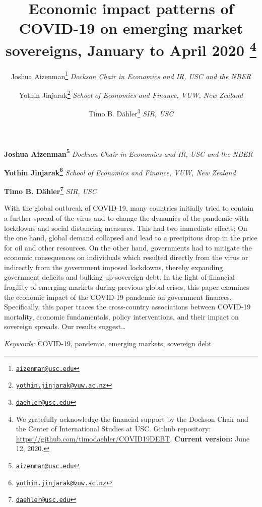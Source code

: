 \documentclass[11pt,]{article}
\title{Economic impact patterns of COVID-19 on emerging market sovereigns,
January to April 2020 \thanks{We gratefully acknowledge the financial support by the Dockson Chair and
the Center of International Studies at USC. Github repository:
\url{https://github.com/timodaehler/COVID19DEBT}. \textbf{Current
version:} June 12, 2020.}  }
\author{\Large Joshua Aizenman\footnote{\href{mailto:aizenman@usc.edu}{\nolinkurl{aizenman@usc.edu}}}\vspace{0.05in} \newline\normalsize\emph{Dockson Chair in Economics and IR, USC and the NBER}   \and \Large Yothin Jinjarak\footnote{\href{mailto:yothin.jinjarak@vuw.ac.nz}{\nolinkurl{yothin.jinjarak@vuw.ac.nz}}}\vspace{0.05in} \newline\normalsize\emph{School of Economics and Finance, VUW, New Zealand}   \and \Large Timo B. Dähler\footnote{\href{mailto:daehler@usc.edu}{\nolinkurl{daehler@usc.edu}}}\vspace{0.05in} \newline\normalsize\emph{SIR, USC}  }
\date{}
\newcommand*{\authorfont}{\fontfamily{phv}\selectfont}
\renewenvironment{abstract}
 {{%
    \setlength{\leftmargin}{0mm}
    \setlength{\rightmargin}{\leftmargin}%
  }%
  \relax}
 {\endlist}
\begin{document}
	
%

{%
\setlength{\parindent}{0pt}
\thispagestyle{plain}
{\fontsize{18}{20}\selectfont\raggedright 
\maketitle  %

}

{
   \vskip 13.5pt\relax \normalsize\fontsize{11}{12} 
\textbf{\authorfont Joshua Aizenman\footnote{\href{mailto:aizenman@usc.edu}{\nolinkurl{aizenman@usc.edu}}}} \hskip 15pt \emph{\small Dockson Chair in Economics and IR, USC and the NBER}   \par \textbf{\authorfont Yothin Jinjarak\footnote{\href{mailto:yothin.jinjarak@vuw.ac.nz}{\nolinkurl{yothin.jinjarak@vuw.ac.nz}}}} \hskip 15pt \emph{\small School of Economics and Finance, VUW, New Zealand}   \par \textbf{\authorfont Timo B. Dähler\footnote{\href{mailto:daehler@usc.edu}{\nolinkurl{daehler@usc.edu}}}} \hskip 15pt \emph{\small SIR, USC}   

}

}








\begin{abstract}

    \hbox{\vrule height .2pt width 39.14pc}

    \vskip 8.5pt %

\noindent With the global outbreak of COVID-19, many countries initially tried to
contain a further spread of the virus and to change the dynamics of the
pandemic with lockdowns and social distancing measures. This had two
immediate effects; On the one hand, global demand collapsed and lead to
a precipitous drop in the price for oil and other resources. On the
other hand, governments had to mitigate the economic consequences on
individuals which resulted directly from the virus or indirectly from
the government imposed lockdowns, thereby expanding government deficits
and bulking up sovereign debt. In the light of financial fragility of
emerging markets during previous global crises, this paper examines the
economic impact of the COVID-19 pandemic on government finances.
Specifically, this paper traces the cross-country associations between
COVID-19 mortality, economic fundamentals, policy interventions, and
their impact on sovereign spreads. Our results suggest\ldots{}


\vskip 8.5pt \noindent \emph{Keywords}: COVID-19, pandemic, emerging markets, sovereign debt \par

    \hbox{\vrule height .2pt width 39.14pc}



\end{abstract}
\end{document}
